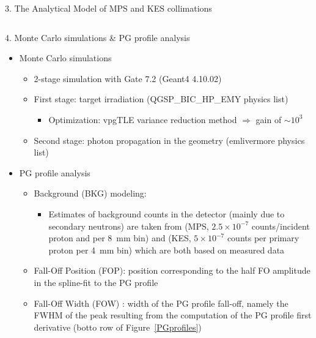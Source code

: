 \documentclass[final]{beamer} %
\begin{document}
\begin{frame}{}
\begin{columns}[t]
\begin{column}{0.49\textwidth}
\begin{block}{3. The Analytical Model of MPS and KES collimations}
\begin{columns}[t]
\begin{column}{0.49\textwidth}
				\end{column}
			\end{columns}
	  \end{block}
		
	  \begin{block}{4. Monte Carlo simulations \& PG profile analysis}
			
			\begin{itemize}
				\item Monte Carlo simulations
				\begin{itemize}
					\item 2-stage simulation with Gate 7.2 (Geant4 4.10.02)
					\item First stage: target irradiation (QGSP\_BIC\_HP\_EMY physics list)
					\begin{itemize}
						\item Optimization: vpgTLE variance reduction method $\Rightarrow$ gain of $\sim 10^3$ \cite{Huisman2016}
					\end{itemize}
					\item Second stage: photon propagation in the geometry (emlivermore physics list)
				\end{itemize}					
				\item PG profile analysis
				\begin{itemize}				
					\item Background (BKG) modeling: 
					\begin{itemize}
						\item Estimates of background counts in the detector (mainly due to secondary neutrons) are taken from \cite{Pinto2014} (MPS, $2.5\times10^{-7}$ counts/incident proton and per 8~mm bin) and \cite{Perali2014} (KES, $5 \times 10^{-7}$ counts per primary proton per 4~mm bin) which are both based on measured data
					\end{itemize}				
					\item Fall-Off Position (FOP): position corresponding to the half FO amplitude in the spline-fit to the PG profile
					\item Fall-Off Width (FOW) : width of the PG profile fall-off, namely the FWHM of the peak resulting from the computation of the PG profile first derivative (botto row of Figure~\ref{PGprofiles})
			\end{itemize}



			\end{itemize}


\end{block}
\end{column}
\end{columns}
\end{frame}
\end{document}
